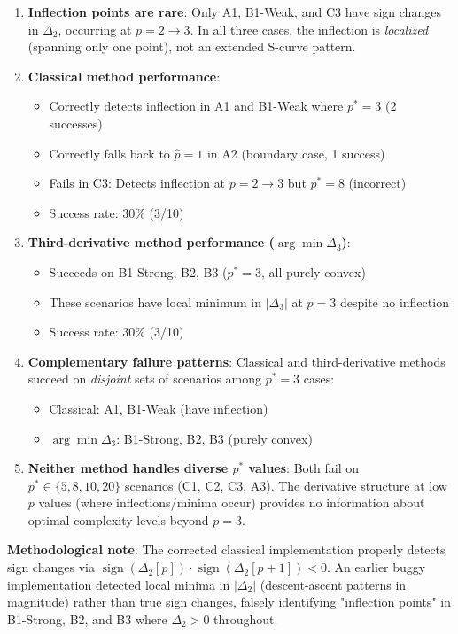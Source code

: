 \documentclass[11pt,a4paper]{article}
\begin{document}
\begin{enumerate}
\item \textbf{Inflection points are rare}: Only A1, B1-Weak, and C3 have sign changes in $\Delta_2$, occurring at $p = 2 \to 3$. In all three cases, the inflection is \emph{localized} (spanning only one point), not an extended S-curve pattern.

\item \textbf{Classical method performance}: 
\begin{itemize}
\item Correctly detects inflection in A1 and B1-Weak where $p^* = 3$ (2 successes)
\item Correctly falls back to $\hat{p} = 1$ in A2 (boundary case, 1 success)
\item Fails in C3: Detects inflection at $p = 2 \to 3$ but $p^* = 8$ (incorrect)
\item Success rate: 30\% (3/10)
\end{itemize}

\item \textbf{Third-derivative method performance ($\arg\min \Delta_3$)}:
\begin{itemize}
\item Succeeds on B1-Strong, B2, B3 ($p^* = 3$, all purely convex)
\item These scenarios have local minimum in $|\Delta_3|$ at $p = 3$ despite no inflection
\item Success rate: 30\% (3/10)
\end{itemize}

\item \textbf{Complementary failure patterns}: Classical and third-derivative methods succeed on \emph{disjoint} sets of scenarios among $p^* = 3$ cases:
\begin{itemize}
\item Classical: A1, B1-Weak (have inflection)
\item $\arg\min \Delta_3$: B1-Strong, B2, B3 (purely convex)
\end{itemize}

\item \textbf{Neither method handles diverse $p^*$ values}: Both fail on $p^* \in \{5, 8, 10, 20\}$ scenarios (C1, C2, C3, A3). The derivative structure at low $p$ values (where inflections/minima occur) provides no information about optimal complexity levels beyond $p = 3$.
\end{enumerate}

\textbf{Methodological note}: The corrected classical implementation properly detects sign changes via $\operatorname{sign}(\Delta_2[p]) \cdot \operatorname{sign}(\Delta_2[p+1]) < 0$. An earlier buggy implementation detected local minima in $|\Delta_2|$ (descent-ascent patterns in magnitude) rather than true sign changes, falsely identifying "inflection points" in B1-Strong, B2, and B3 where $\Delta_2 > 0$ throughout.
\end{document}
